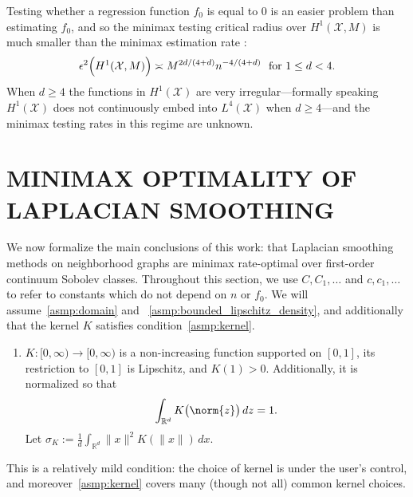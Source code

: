 \documentclass[twoside]{article}
\newcommand{\Reals}{\mathbb{R}}
\newcommand{\1}{\mathbf{1}}
\newcommand{\Rd}{\Reals^d}
\newcommand{\Xset}{\mathcal{X}}
\newcommand{\Leb}{L}
\theoremstyle{definition}
\theoremstyle{remark}
\begin{document}
Testing whether a regression function $f_0$ is equal to $0$ is an easier problem than estimating $f_0$, and so the minimax testing critical radius over $H^1(\Xset,M)$ is much smaller than the minimax estimation rate \citep{ingster2009}:
\begin{equation}
\label{eqn:sobolev_space_testing_critical_radius}
\epsilon^2\Bigl(H^1(\Xset,M)\Bigr) \asymp M^{2d/(4 + d)}n^{-4/(4 + d)}~~\textrm{for $1 \leq d < 4$.}
\end{equation}
When $d \geq 4$ the functions in $H^1(\Xset)$ are very irregular---formally speaking $H^1(\Xset)$ does not continuously embed into $\Leb^4(\Xset)$ when $d \geq 4$---and the minimax testing rates in this regime are unknown. 

\section{MINIMAX OPTIMALITY OF LAPLACIAN SMOOTHING}
\label{sec:minimax_optimal_laplacian_smoothing}

We now formalize the main conclusions of this work: that Laplacian smoothing methods on neighborhood graphs are minimax rate-optimal over first-order continuum Sobolev classes. Throughout this section, we use $C,C_1,\ldots$ and $c,c_1,\ldots$ to refer to constants which do not depend on $n$ or $f_0$. We will assume~\ref{asmp:domain} and ~\ref{asmp:bounded_lipschitz_density}, and additionally that the kernel $K$ satisfies condition~\ref{asmp:kernel}. 
\begin{enumerate}[label=(K\arabic*)]
	\item
	\label{asmp:kernel}
	$K:[0,\infty) \to [0,\infty)$ is a non-increasing function supported on $[0,1]$, its restriction to $[0,1]$ is Lipschitz, and $K(1) > 0$. Additionally, it is normalized so that
	\begin{equation*}
	\int_{\Reals^d} K\bigl(\norm{z}\bigr) \,dz = 1.
	\end{equation*}
	Let $\sigma_K := \frac{1}{d} \int_{\Rd} \|x\|^2 K(\|x\|) \,dx$.
\end{enumerate}
This is a relatively mild condition: the choice of kernel is under the user's control, and moreover~\ref{asmp:kernel} covers many (though not all) common kernel choices.
\end{document}
